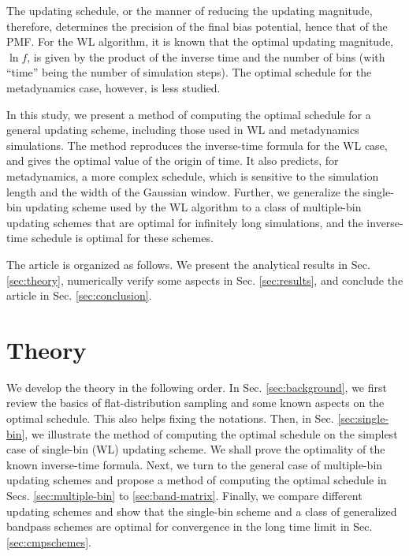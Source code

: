 \documentclass[reprint, floatfix]{revtex4-1}
\begin{document}
The updating schedule,
or the manner of reducing
the updating magnitude,
therefore,
determines the precision of the final bias potential,
hence that of the PMF\cite{liang2007,
belardinelli2007, belardinelli2007jcp, belardinelli2008,
morozov2007, zhou2008, morozov2009,
komura2012, caparica2012, caparica2014,
barducci2008, dickson2011, dama2014}.
%
For the WL algorithm, it is known
that the optimal updating magnitude, $\ln f$,
is given by the product of the
inverse time\cite{liang2007,
belardinelli2007, belardinelli2007jcp, belardinelli2008,
morozov2007, zhou2008}
and the number of bins
(with ``time'' being
the number of simulation steps).
%
The optimal schedule for the metadynamics case,
however, is less studied.


In this study,
we present a method of computing
the optimal schedule
for a general updating scheme,
including those used in WL and metadynamics simulations.
%
The method reproduces the inverse-time formula
for the WL case,
and gives the optimal value of the origin of time.
%
It also predicts, for metadynamics,
a more complex schedule,
which is sensitive to the simulation length
and the width of the Gaussian window.
%
Further, we generalize
the single-bin updating scheme
used by the WL algorithm
to a class of multiple-bin updating schemes
that are optimal for infinitely long simulations,
and the inverse-time schedule is optimal for these schemes.
%



The article is organized as follows.
%
We present the analytical results in Sec. \ref{sec:theory},
numerically verify some aspects
in Sec. \ref{sec:results},
and conclude the article
in Sec. \ref{sec:conclusion}.




\section{\label{sec:theory}
Theory}



We develop the theory
in the following order.
%
In Sec. \ref{sec:background},
we first review the basics of
flat-distribution sampling
and some known aspects on the optimal schedule.
%
This also helps fixing the notations.
%
Then, in Sec. \ref{sec:single-bin},
we illustrate the method of
computing the optimal schedule
on the simplest case of
single-bin (WL) updating scheme.
%
We shall prove the optimality
of the known inverse-time formula.
%
Next, we turn to the general case
of multiple-bin updating schemes
and propose a method of computing
the optimal schedule
in Secs. \ref{sec:multiple-bin}
to \ref{sec:band-matrix}.
%
Finally, we compare different updating schemes
and show that the single-bin scheme
and a class of generalized bandpass schemes
are optimal for convergence
in the long time limit
in Sec. \ref{sec:cmpschemes}.
\end{document}
